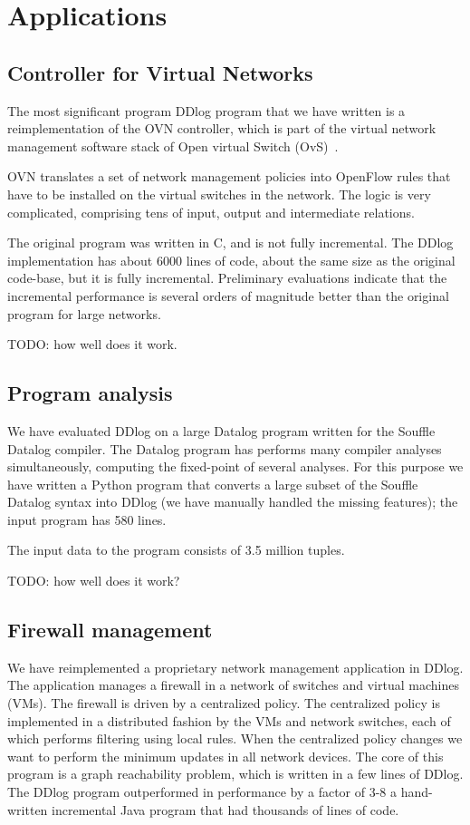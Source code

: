 \section{Applications}\label{sec:applications}

\subsection{Controller for Virtual Networks}

The most significant program DDlog program that we have written is a
reimplementation of the OVN controller, which is part of the virtual
network management software stack of Open virtual Switch
(OvS)~\cite{Pfaff-nsdi15}.

OVN translates a set of network management policies into OpenFlow
rules that have to be installed on the virtual switches in the
network.  The logic is very complicated, comprising tens of input,
output and intermediate relations.

The original program was written in C, and is not fully incremental.
The DDlog implementation has about 6000 lines of code, about the same
size as the original code-base, but it is fully incremental.
Preliminary evaluations indicate that the incremental performance is
several orders of magnitude better than the original program for large
networks.

TODO: how well does it work.

\subsection{Program analysis}

We have evaluated DDlog on a large Datalog program written for the
Souffle Datalog compiler.  The Datalog program has performs many
compiler analyses simultaneously, computing the fixed-point of several
analyses.  For this purpose we have written a Python program that
converts a large subset of the Souffle Datalog syntax into DDlog (we
have manually handled the missing features); the input program has
580 lines.

The input data to the program consists of 3.5 million tuples.

TODO: how well does it work?

\subsection{Firewall management}

We have reimplemented a proprietary network management application in
DDlog.  The application manages a firewall in a network of switches
and virtual machines (VMs).  The firewall is driven by a centralized
policy.  The centralized policy is implemented in a distributed
fashion by the VMs and network switches, each of which performs
filtering using local rules.  When the centralized policy changes we
want to perform the minimum updates in all network devices.  The core
of this program is a graph reachability problem, which is written in a
few lines of DDlog.  The DDlog program outperformed in performance by
a factor of 3-8 a hand-written incremental Java program that had
thousands of lines of code.
